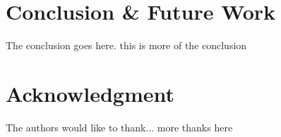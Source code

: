 \documentclass[10pt, conference, compsocconf]{IEEEtran}
\begin{document}
\section{Conclusion \& Future Work}
The conclusion goes here. this is more of the conclusion



\section*{Acknowledgment}


The authors would like to thank...
more thanks here




%
%
%
%
%

\nocite{hinton2000,code,aistats}





\end{document}

